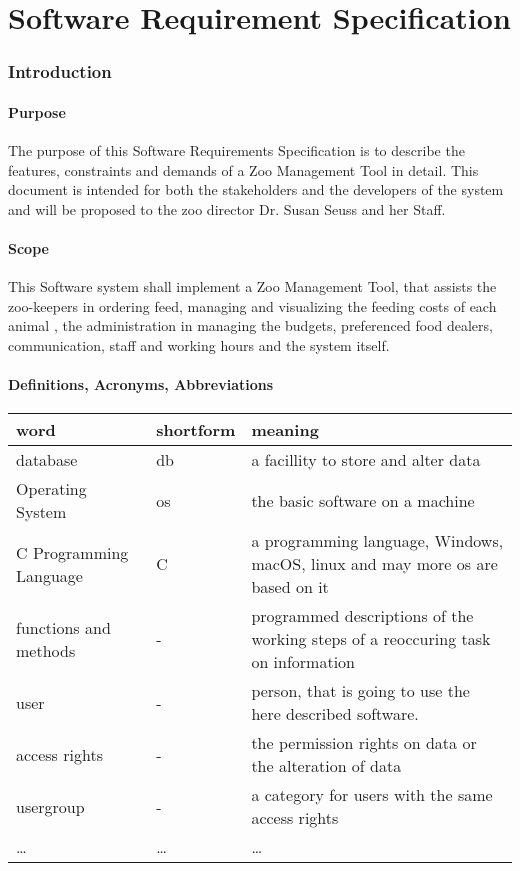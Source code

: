 \chapter{Software Requirement Specification}

\subsection{Introduction}
	\subsubsection{Purpose}
			The purpose of this Software Requirements Specification is to describe the features, constraints and demands of a Zoo Management Tool in detail. This document is intended for both the stakeholders and the developers of the system and will be proposed to the zoo director Dr. Susan Seuss and her Staff.
	\subsubsection{Scope}
			This Software system shall implement a Zoo Management Tool, that assists the zoo-keepers in ordering feed, managing and visualizing the feeding costs of each animal , the administration in managing the budgets, preferenced food dealers, communication, staff and working hours and the system itself.

	\subsubsection{Definitions, Acronyms, Abbreviations}
	\begin{longtable}{|>{\raggedright \arraybackslash}p{3.0cm}||
	>{\raggedright \arraybackslash}p{2.0cm}|>{\raggedright \arraybackslash}p{10.0cm}|} \hline

	word & shortform & meaning \\ \hline
	database & db & a facillity to store and alter data \\ \hline
	Operating System & os & the basic software on a machine \\ \hline
	C Programming Language & C & a programming language, Windows, macOS, linux and may more os are based on it \\ \hline
	functions and methods & - & programmed descriptions of the working steps of a reoccuring task on information \\ \hline
	user & - & person, that is going to use the here described software. \\ \hline
	access rights & - & the permission rights on data or the alteration of data \\ \hline
	usergroup & - & a category for users with the same access rights \\ \hline
	\dots & \dots & \dots \\ \hline
	\hline
	\end{longtable}


